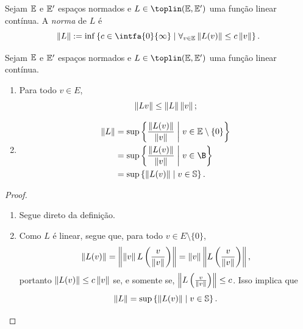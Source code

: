 \begin{defi}
Sejam $\mathbb{E}$ e $\mathbb{E}'$ espaços normados e $L \in \toplin(\E, \E')$ uma função linear contínua. A \emph{norma} de $L$ é
	\begin{equation*}
	\nor{L} := \inf\set{c \in \intfa{0}{\infty}}{\forall_{v \in \E} \nor{L(v)} \leq c\nor{v}}.
	\end{equation*}
\end{defi}



\begin{prop}
Sejam $\mathbb{E}$ e $\mathbb{E}'$ espaços normados e $L \in \toplin(\E, \E')$ uma função linear contínua.
	\begin{enumerate}
	\item Para todo $v \in E$,
		\begin{equation*}
		\left\Vert{Lv}\right\Vert \leq \left\Vert{L}\right\Vert\left\Vert{v}\right\Vert;
		\end{equation*}
		
	\item 
		\begin{align*}
		\nor{L} &= \sup \set{\frac{\nor{L(v)}}{\nor{v}}}{v \in \E \setminus \{0\}} \\
		& = \sup \set{\frac{\nor{L(v)}}{\nor{v}}}{v \in \B} \\
		&= \sup\set{\nor{L(v)}}{v \in \S}.
		\end{align*}
	\end{enumerate}
\end{prop}
\begin{proof}
	\begin{enumerate}
	\item Segue direto da definição.

	\item Como $L$ é linear, segue que, para todo $v \in E\setminus\{0\}$,
	\begin{equation*}
	\left\Vert{L(v)}\right\Vert = \left\Vert{\left\Vert{v}\right\Vert L\left(\frac{v}{\left\Vert{v}\right\Vert}\right)}\right\Vert = \left\Vert{v}\right\Vert\left\Vert{L\left(\frac{v}{\left\Vert{v}\right\Vert}\right)}\right\Vert,
	\end{equation*}
portanto $\left\Vert{L(v)}\right\Vert \leq c\left\Vert{v}\right\Vert$ se, e somente se, $\left\Vert{L\left(\frac{v}{\left\Vert{v}\right\Vert}\right)}\right\Vert \leq c$. Isso implica que
	\begin{equation*}
	\left\Vert{L}\right\Vert = \sup\left\{\left\Vert{L(v)}\right\Vert \;\middle\vert\; v \in \mathbb{S} \right\}.
	\end{equation*}
	\end{enumerate}
\end{proof}




